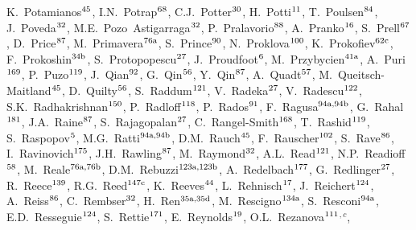 \begin{flushleft}
K.~Potamianos$^\textrm{\scriptsize 45}$,
I.N.~Potrap$^\textrm{\scriptsize 68}$,
C.J.~Potter$^\textrm{\scriptsize 30}$,
H.~Potti$^\textrm{\scriptsize 11}$,
T.~Poulsen$^\textrm{\scriptsize 84}$,
J.~Poveda$^\textrm{\scriptsize 32}$,
M.E.~Pozo~Astigarraga$^\textrm{\scriptsize 32}$,
P.~Pralavorio$^\textrm{\scriptsize 88}$,
A.~Pranko$^\textrm{\scriptsize 16}$,
S.~Prell$^\textrm{\scriptsize 67}$,
D.~Price$^\textrm{\scriptsize 87}$,
M.~Primavera$^\textrm{\scriptsize 76a}$,
S.~Prince$^\textrm{\scriptsize 90}$,
N.~Proklova$^\textrm{\scriptsize 100}$,
K.~Prokofiev$^\textrm{\scriptsize 62c}$,
F.~Prokoshin$^\textrm{\scriptsize 34b}$,
S.~Protopopescu$^\textrm{\scriptsize 27}$,
J.~Proudfoot$^\textrm{\scriptsize 6}$,
M.~Przybycien$^\textrm{\scriptsize 41a}$,
A.~Puri$^\textrm{\scriptsize 169}$,
P.~Puzo$^\textrm{\scriptsize 119}$,
J.~Qian$^\textrm{\scriptsize 92}$,
G.~Qin$^\textrm{\scriptsize 56}$,
Y.~Qin$^\textrm{\scriptsize 87}$,
A.~Quadt$^\textrm{\scriptsize 57}$,
M.~Queitsch-Maitland$^\textrm{\scriptsize 45}$,
D.~Quilty$^\textrm{\scriptsize 56}$,
S.~Raddum$^\textrm{\scriptsize 121}$,
V.~Radeka$^\textrm{\scriptsize 27}$,
V.~Radescu$^\textrm{\scriptsize 122}$,
S.K.~Radhakrishnan$^\textrm{\scriptsize 150}$,
P.~Radloff$^\textrm{\scriptsize 118}$,
P.~Rados$^\textrm{\scriptsize 91}$,
F.~Ragusa$^\textrm{\scriptsize 94a,94b}$,
G.~Rahal$^\textrm{\scriptsize 181}$,
J.A.~Raine$^\textrm{\scriptsize 87}$,
S.~Rajagopalan$^\textrm{\scriptsize 27}$,
C.~Rangel-Smith$^\textrm{\scriptsize 168}$,
T.~Rashid$^\textrm{\scriptsize 119}$,
S.~Raspopov$^\textrm{\scriptsize 5}$,
M.G.~Ratti$^\textrm{\scriptsize 94a,94b}$,
D.M.~Rauch$^\textrm{\scriptsize 45}$,
F.~Rauscher$^\textrm{\scriptsize 102}$,
S.~Rave$^\textrm{\scriptsize 86}$,
I.~Ravinovich$^\textrm{\scriptsize 175}$,
J.H.~Rawling$^\textrm{\scriptsize 87}$,
M.~Raymond$^\textrm{\scriptsize 32}$,
A.L.~Read$^\textrm{\scriptsize 121}$,
N.P.~Readioff$^\textrm{\scriptsize 58}$,
M.~Reale$^\textrm{\scriptsize 76a,76b}$,
D.M.~Rebuzzi$^\textrm{\scriptsize 123a,123b}$,
A.~Redelbach$^\textrm{\scriptsize 177}$,
G.~Redlinger$^\textrm{\scriptsize 27}$,
R.~Reece$^\textrm{\scriptsize 139}$,
R.G.~Reed$^\textrm{\scriptsize 147c}$,
K.~Reeves$^\textrm{\scriptsize 44}$,
L.~Rehnisch$^\textrm{\scriptsize 17}$,
J.~Reichert$^\textrm{\scriptsize 124}$,
A.~Reiss$^\textrm{\scriptsize 86}$,
C.~Rembser$^\textrm{\scriptsize 32}$,
H.~Ren$^\textrm{\scriptsize 35a,35d}$,
M.~Rescigno$^\textrm{\scriptsize 134a}$,
S.~Resconi$^\textrm{\scriptsize 94a}$,
E.D.~Resseguie$^\textrm{\scriptsize 124}$,
S.~Rettie$^\textrm{\scriptsize 171}$,
E.~Reynolds$^\textrm{\scriptsize 19}$,
O.L.~Rezanova$^\textrm{\scriptsize 111}$$^{,c}$,
$$
\end{flushleft}
